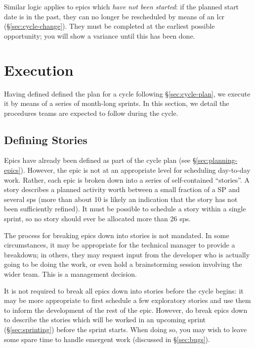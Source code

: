 Similar logic applies to \glspl{epic} which \emph{have not been started}: if
the planned start date is in the past, they can no longer be rescheduled
by means of an \gls{lcr} (\S\ref{sec:cycle-change}). They must
be completed at the earliest possible opportunity; you will show a
variance until this has been done.

\section{Execution}
\label{sec:execution}

Having defined defined the plan for a \gls{cycle} following \S\ref{sec:cycle-plan}, we execute it by means of a series of month-long sprints.
In this section, we detail the procedures teams are expected to follow during the cycle.

\subsection{Defining Stories}
\label{sec:defining-stories}

Epics have already been defined as part of the \gls{cycle} plan (see \S\ref{sec:planning-epics}).
However, the \gls{epic} is not at an appropriate level for scheduling day-to-day work.
Rather, each \gls{epic} is broken down into a series of self-contained ``stories''.
A \gls{story} describes a planned activity worth between a small fraction of a SP and several \glspl{sp} (more than about 10 is likely an indication that the \gls{story} has not been sufficiently refined).
It must be possible to schedule a \gls{story} within a single sprint, so no \gls{story} should ever be allocated more than 26 \glspl{sp}.

The process for breaking \glspl{epic} down into stories is not mandated. In
some circumstances, it may be appropriate for the technical manager to
provide a breakdown; in others, they may request input from the
developer who is actually going to be doing the work, or even hold a
brainstorming session involving the wider team. This is a management
decision.

It is not required to break all \glspl{epic} down into stories before the \gls{cycle} begins: it may be more appropriate to first schedule a few exploratory stories and use them to inform the development of the rest of the \gls{epic}.
However, do break \glspl{epic} down to describe the stories which will be worked in an upcoming sprint (\S\ref{sec:sprinting}) before the sprint starts.
When doing so, you may wish to leave some spare time to handle emergent work (discussed in \S\ref{sec:bugs}).

